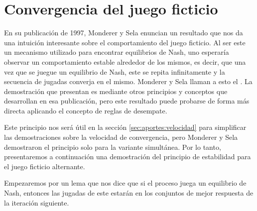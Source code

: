 \section{Convergencia del juego ficticio} \label{sec:convergencia:fp}

En su publicación de 1997, Monderer y Sela \cite{no:cycling} enuncian un resultado que nos da una intuición interesante sobre el comportamiento del juego ficticio. Al ser este un mecanismo utilizado para encontrar equilibrios de Nash, uno esperaría observar un comportamiento estable alrededor de los mismos, es decir, que una vez que se juegue un equilibrio de Nash, este se repita infinitamente y la secuencia de jugadas converja en el mismo. Monderer y Sela llaman a esto el . La demostración que presentan es mediante otros principios y conceptos que desarrollan en esa publicación, pero este resultado puede probarse de forma más directa aplicando el concepto de reglas de desempate.

Este principio nos será útil en la sección \ref{sec:aportes:velocidad} para simplificar las demostraciones sobre la velocidad de convergencia, pero Monderer y Sela demostraron el principio solo para la variante simultánea. Por lo tanto, presentaremos a continuación una demostración del principio de estabilidad para el juego ficticio alternante.

Empezaremos por un lema que nos dice que si el proceso juega un equilibrio de Nash, entonces las jugadas de este estarán en los conjuntos de mejor respuesta de la iteración siguiente. 

